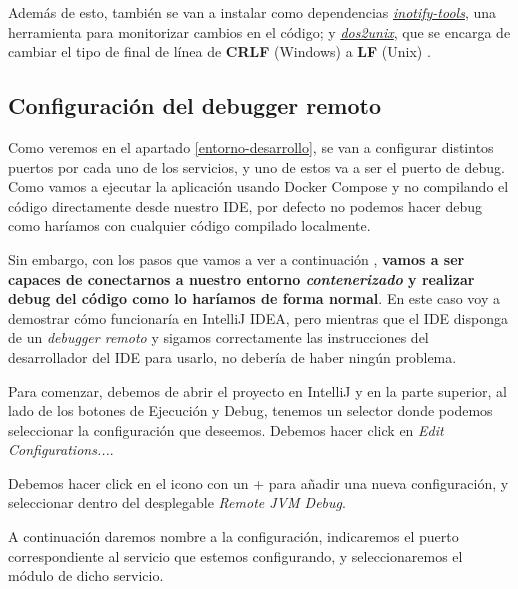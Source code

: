 Además de esto, también se van a instalar como dependencias \textit{\href{https://github.com/inotify-tools}{inotify-tools}}, una herramienta para monitorizar cambios en el código; y \textit{\href{https://dos2unix.sourceforge.io/}{dos2unix}}, que se encarga de cambiar el tipo de final de línea de \textbf{CRLF} (Windows) a \textbf{LF} (Unix) \cite{medium:spring-boot-in-docker}.

\subsection{Configuración del debugger remoto}

Como veremos en el apartado \ref{entorno-desarrollo}, se van a configurar distintos puertos por cada uno de los servicios, y uno de estos va a ser el puerto de debug. Como vamos a ejecutar la aplicación usando Docker Compose y no compilando el código directamente desde nuestro IDE, por defecto no podemos hacer debug como haríamos con cualquier código compilado localmente. 

Sin embargo, con los pasos que vamos a ver a continuación \cite{medium:spring-boot-in-docker}, \textbf{vamos a ser capaces de conectarnos a nuestro entorno \textit{contenerizado} y realizar debug del código como lo haríamos de forma normal}. En este caso voy a demostrar cómo funcionaría en IntelliJ IDEA, pero mientras que el IDE disponga de un \textit{debugger remoto} y sigamos correctamente las instrucciones del desarrollador del IDE para usarlo, no debería de haber ningún problema.


Para comenzar, debemos de abrir  el proyecto en IntelliJ y en la parte superior, al lado de los botones de Ejecución y Debug, tenemos un selector donde podemos seleccionar la configuración que deseemos. Debemos hacer click en \textit{Edit Configurations...}.


Debemos hacer click en el icono con un + para añadir una nueva configuración, y seleccionar dentro del desplegable \textit{Remote JVM Debug}.


A continuación daremos nombre a la configuración, indicaremos el puerto correspondiente al servicio que estemos configurando, y seleccionaremos el módulo de dicho servicio.


